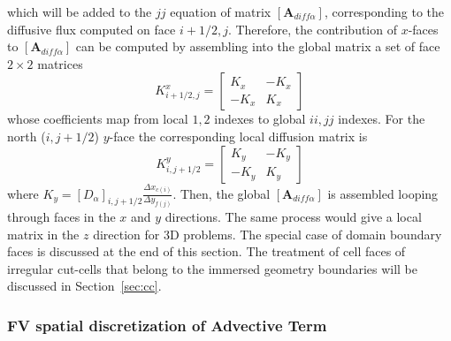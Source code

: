 \documentclass[12pt]{article}
\begin{document}
%
which will be added to the $jj$ equation of matrix $\left[ \mathbf{A}_{diff \alpha} \right]$, corresponding to the diffusive flux computed on face $i+1/2,j$. Therefore, the contribution of $x$-faces to $\left[ \mathbf{A}_{diff \alpha} \right]$ can be computed by assembling into the global matrix a set of face $2 \times 2$ matrices
%
\begin{equation}
   K^x_{i+1/2,j} = \left[ \begin{array}{cc} K_x & -K_x \\ -K_x & K_x \end{array} \right]
\end{equation}
whose coefficients map from local $1,2$ indexes to global $ii,jj$ indexes.
For the north ($i,j+1/2$) $y$-face the corresponding local diffusion matrix is
%
\begin{equation}
   K^y_{i,j+1/2} = \left[ \begin{array}{cc} K_y & -K_y \\ -K_y & K_y \end{array} \right]
\end{equation}
%
where $K_y=[D_\alpha]_{i,j+1/2} \frac{\Delta x_{c(i)}}{\Delta y_{f(j)}}$. Then, the global $\left[ \mathbf{A}_{diff \alpha} \right]$ is assembled looping through faces in the $x$ and $y$ directions. The same process would give a local matrix in the $z$ direction for 3D problems. The special case of domain boundary faces is discussed at the end of this section. The treatment of cell faces of irregular cut-cells that belong to the immersed geometry boundaries will be discussed in Section~\ref{sec:cc}.

\subsubsection*{FV spatial discretization of Advective Term}
\end{document}
